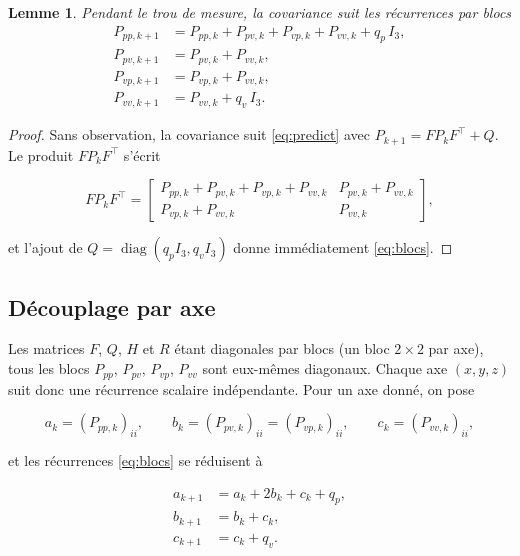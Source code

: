 \documentclass[11pt]{article}
\newtheorem{lemma}[theorem]{Lemme}
\theoremstyle{remark}
\theoremstyle{definition}
\begin{document}
\begin{lemma}\label{lem:blocs}
Pendant le trou de mesure, la covariance suit les r\'ecurrences par blocs
\begin{equation}
\boxed{\begin{aligned}
P_{pp,k+1} &= P_{pp,k} + P_{pv,k} + P_{vp,k} + P_{vv,k} + q_p\, I_3, \\[2pt]
P_{pv,k+1} &= P_{pv,k} + P_{vv,k}, \\[2pt]
P_{vp,k+1} &= P_{vp,k} + P_{vv,k}, \\[2pt]
P_{vv,k+1} &= P_{vv,k} + q_v\, I_3.
\end{aligned}}
\label{eq:blocs}
\end{equation}
\end{lemma}

\begin{proof}
Sans observation, la covariance suit \eqref{eq:predict} avec $P_{k+1} = F P_k F^\top + Q$. Le produit
$F P_k F^\top$ s'\'ecrit

\begin{equation}
F P_k F^\top =
\begin{bmatrix}
P_{pp,k} + P_{pv,k} + P_{vp,k} + P_{vv,k} & P_{pv,k} + P_{vv,k} \\[2pt]
P_{vp,k} + P_{vv,k} & P_{vv,k}
\end{bmatrix},
\end{equation}

et l'ajout de $Q = \operatorname{diag}(q_p I_3, q_v I_3)$ donne imm\'ediatement \eqref{eq:blocs}.
\end{proof}

\subsection{D\'ecouplage par axe}

Les matrices $F$, $Q$, $H$ et $R$ \'etant diagonales par blocs (un bloc $2\times 2$ par axe), tous les
blocs $P_{pp}$, $P_{pv}$, $P_{vp}$, $P_{vv}$ sont eux-m\^emes diagonaux. Chaque axe $(x,y,z)$ suit donc
une r\'ecurrence scalaire ind\'ependante. Pour un axe donn\'e, on pose

\begin{equation}
a_k = (P_{pp,k})_{ii},
\qquad
b_k = (P_{pv,k})_{ii} = (P_{vp,k})_{ii},
\qquad
c_k = (P_{vv,k})_{ii},
\end{equation}

et les r\'ecurrences \eqref{eq:blocs} se r\'eduisent \`a

\begin{equation}
\boxed{\begin{aligned}
a_{k+1} &= a_k + 2b_k + c_k + q_p, \\[2pt]
b_{k+1} &= b_k + c_k, \\[2pt]
c_{k+1} &= c_k + q_v.
\end{aligned}}
\label{eq:scalaires}
\end{equation}
\end{document}
